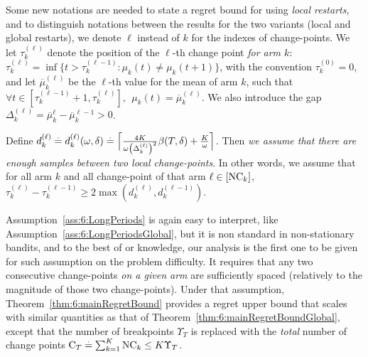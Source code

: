 Some new notations are needed to state a regret bound for \GLRklUCB{} using \emph{local restarts},
and to distinguish notations between the results for the two variants (local and global restarts), we denote $\ell$ instead of $k$ for the indexes of change-points.
We let $\tau_k^{(\ell)}$ denote the position of the $\ell$-th change point \emph{for arm $k$}: $\tau_k^{(\ell)} = \inf \{ t > \tau_k^{(\ell - 1)} : \mu_k(t) \neq \mu_k(t+1)\}$,
with the convention $\tau_k^{(0)}=0$, and let $\overline{\mu}_k^{(\ell)}$ be the $\ell$-th value for the mean of arm $k$, such that $\forall t \in [\tau_k^{(\ell-1)}+1, \tau_k^{(\ell)}], \ \ \mu_k(t) = \overline{\mu}_k^{(\ell)}$.
We also introduce the gap $\Delta_k^{(\ell)} = \overline{\mu}_k^{\ell} - \overline{\mu}_k^{\ell-1} > 0$.

\begin{assumption}\label{ass:6:LongPeriods}
\begin{leftbar}[assumptionbar]  %
    Define
    $d_k^{(\ell)} \overset{.}{=} d_k^{(\ell)}(\omega,\delta) \overset{.}{=} \Bigl\lceil \frac{4K}{\omega\left(\Delta_k^{(\ell)}\right)^2}\beta(T,\delta) + \frac{K}{\omega} \Bigr\rceil$.
    Then \emph{we assume that there are enough samples between two local change-points}.
    In other words, we assume that for all arm $k$ and all change-point of that arm $\ell \in [\text{NC}_k]$, $\tau_k^{(\ell)} - \tau_k^{(\ell-1)} \geq 2\max (d_k^{(\ell)},d_k^{(\ell-1)})$.
\end{leftbar}  %
\end{assumption}

Assumption~\ref{ass:6:LongPeriods} is again easy to interpret, like Assumption~\ref{ass:6:LongPeriodsGlobal}, but it is non standard in non-stationary bandits, and to the best of or knowledge, our analysis is the first one to be given for such assumption on the problem difficulty.
%
It requires that any two consecutive change-points \emph{on a given arm} are sufficiently spaced (relatively to the magnitude of those two change-points). Under that assumption, Theorem~\ref{thm:6:mainRegretBound} provides a regret upper bound that scales with similar quantities as that of Theorem~\ref{thm:6:mainRegretBoundGlobal}, except that the number of breakpoints $\Upsilon_T$ is replaced with the \emph{total} number of change points $\mathrm{C}_T \overset{.}{=} \sum_{k=1}^K \text{NC}_k \leq K \Upsilon_T$.

